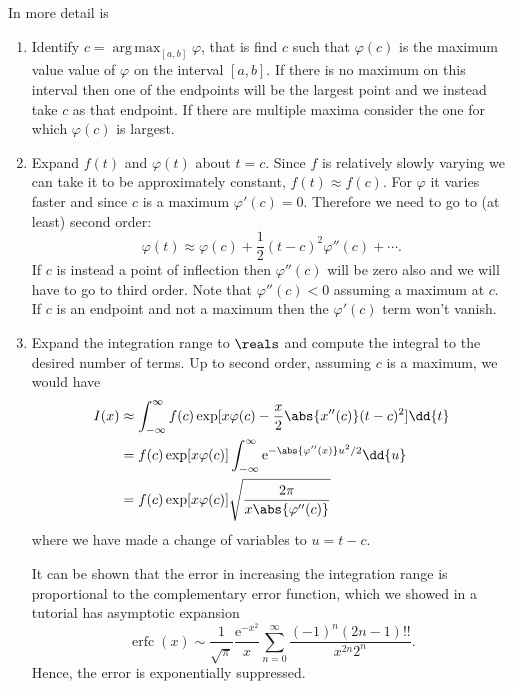 \documentclass[fleqn]{NotesClass}
\newcommand*{\e}{\mathrm{e}}
\DeclareMathOperator*{\argmax}{arg\,max}
\DeclareMathOperator{\erfc}{erfc}
\begin{document}
    In more detail  is
    \begin{enumerate}
        \item Identify \(c = \argmax_{[a, b]}\varphi\), that is find \(c\) such that \(\varphi(c)\) is the maximum value value of \(\varphi\) on the interval \([a, b]\).
        If there is no maximum on this interval then one of the endpoints will be the largest point and we instead take \(c\) as that endpoint.
        If there are multiple maxima consider the one for which \(\varphi(c)\) is largest.
        
        \item Expand \(f(t)\) and \(\varphi(t)\) about \(t = c\).
        Since \(f\) is relatively slowly varying we can take it to be approximately constant, \(f(t) \approx f(c)\).
        For \(\varphi\) it varies faster and since \(c\) is a maximum \(\varphi'(c) = 0\).
        Therefore we need to go to (at least) second order:
        \begin{equation}
            \varphi(t) \approx \varphi(c) + \frac{1}{2}(t - c)^2\varphi''(c) + \dotsb.
        \end{equation}
        If \(c\) is instead a point of inflection then \(\varphi''(c)\) will be zero also and we will have to go to third order.
        Note that \(\varphi''(c) < 0\) assuming a maximum at \(c\).
        If \(c\) is an endpoint and not a maximum then the \(\varphi'(c)\) term won't vanish.
        
        
        \item Expand the integration range to \(\reals\) and compute the integral to the desired number of terms.
        Up to second order, assuming \(c\) is a maximum, we would have
        \begin{align}
            I(x) &\approx \int_{-\infty}^{\infty} f(c) \exp[x\varphi(c) - \frac{x}{2}\abs{x''(c)}(t- c)^2] \dd{t}\\
            &= f(c)\exp[x\varphi(c)] \int_{-\infty}^{\infty} \e^{-\abs{\varphi''(x)}u^2/2}\dd{u}\\
            &= f(c)\exp[x\varphi(c)] \sqrt{\frac{2\pi}{x\abs{\varphi''(c)}}}\label{eqn:laplace method result}
        \end{align}
        where we have made a change of variables to \(u = t - c\).
        
        It can be shown that the error in increasing the integration range is proportional to the complementary error function, which we showed in a tutorial has asymptotic expansion
        \begin{equation}
            \erfc(x) \sim \frac{1}{\sqrt{\pi}} \frac{\e^{-x^2}}{x} \sum_{n=0}^{\infty} \frac{(-1)^n(2n - 1)!!}{x^{2n}2^n}.
        \end{equation}
        Hence, the error is exponentially suppressed.
    \end{enumerate}
    
\end{document}
